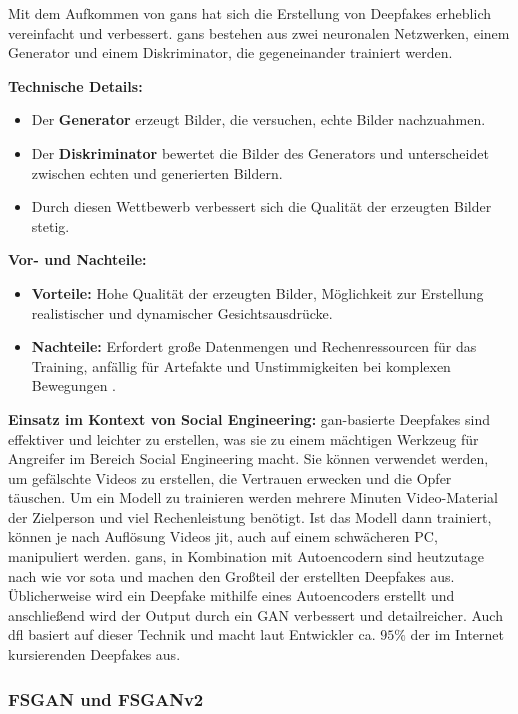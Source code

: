 Mit dem Aufkommen von \glspl{gan} hat sich die Erstellung von Deepfakes erheblich vereinfacht und verbessert.
\glspl{gan} bestehen aus zwei neuronalen Netzwerken, einem Generator und einem Diskriminator, die gegeneinander trainiert werden.\cite{Deepfakes-a-survey-and-introduction-to-the-topical-collection}

\textbf{Technische Details:}
\begin{itemize}
    \item Der \textbf{Generator} erzeugt Bilder, die versuchen, echte Bilder nachzuahmen.
    \item Der \textbf{Diskriminator} bewertet die Bilder des Generators und unterscheidet zwischen echten und generierten Bildern.
    \item Durch diesen Wettbewerb verbessert sich die Qualität der erzeugten Bilder stetig.
\end{itemize}

\textbf{Vor- und Nachteile:}
\begin{itemize}
    \item \textbf{Vorteile:} Hohe Qualität der erzeugten Bilder, Möglichkeit zur Erstellung realistischer und dynamischer Gesichtsausdrücke.
    \item \textbf{Nachteile:} Erfordert große Datenmengen und Rechenressourcen für das Training, anfällig für Artefakte und Unstimmigkeiten bei komplexen Bewegungen \cite{Deepfakes-An-Overview}.
\end{itemize}

\textbf{Einsatz im Kontext von Social Engineering:} \gls{gan}-basierte Deepfakes sind effektiver und leichter zu erstellen, was sie zu einem mächtigen Werkzeug für Angreifer im Bereich Social Engineering macht.
Sie können verwendet werden, um gefälschte Videos zu erstellen, die Vertrauen erwecken und die Opfer täuschen.
Um ein Modell zu trainieren werden mehrere Minuten Video-Material der Zielperson und viel Rechenleistung benötigt.
Ist das Modell dann trainiert, können je nach Auflösung Videos \gls{jit}, auch auf einem schwächeren PC, manipuliert werden.
\glspl{gan}, in Kombination mit Autoencodern sind heutzutage nach wie vor \gls{sota} und machen den Großteil der erstellten Deepfakes aus.
Üblicherweise wird ein Deepfake mithilfe eines Autoencoders erstellt und anschließend wird der Output durch ein \gls{GAN} verbessert und detailreicher.
Auch \gls{dfl} basiert auf dieser Technik und macht laut Entwickler ca. $95\%$ der im Internet kursierenden Deepfakes aus\cite{dfl-github-repo}.

\subsubsection{FSGAN und FSGANv2}\label{subsubsec:fsgan}

